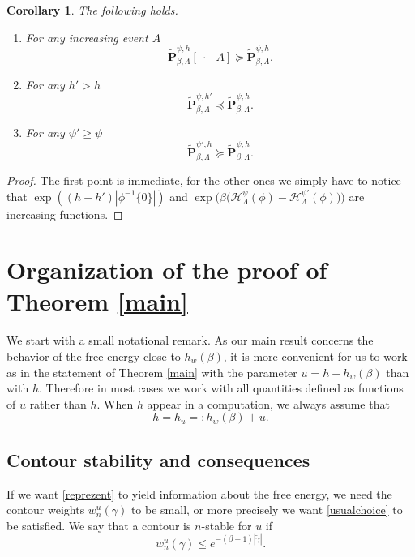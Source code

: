 \documentclass[10pt]{amsart}
\let\mathcal\mathscr
\newenvironment{enumeratei}
{\bgroup\def\theenumi{\roman{enumi}}\def\theenumii{\Alph{enumii}}\begin{enumerate}}
{\end{enumerate}\egroup}
\numberwithin{equation}{section}
\theoremstyle{plain}
\newtheorem{cor}[theorem]{Corollary}
\theoremstyle{definition}
\newcommand{\cH}{{\ensuremath{\mathcal H}} }
\newcommand{\bP}{{\ensuremath{\mathbf P}} }
\newcommand{\gb}{\beta}
\newcommand{\gL}{\Lambda}
\begin{document}
\begin{cor}\label{FKalt}
The following holds.
\begin{enumeratei}
\item
For any increasing event $A$
\begin{equation*}%
\tilde \bP^{\psi,h}_{\gb,\gL}[ \ \cdot \ | \ A] \succcurlyeq \tilde \bP^{\psi,h}_{\gb,\gL}.
\end{equation*}
\item
For any $h'>h$
\begin{equation*}
\tilde \bP^{\psi,h'}_{\gb,\gL} \preccurlyeq \tilde \bP^{\psi,h}_{\gb,\gL}.
\end{equation*}
\item
For any $\psi'\ge \psi$
\begin{equation*}
\tilde \bP^{\psi',h}_{\gb,\gL} \succcurlyeq \tilde \bP^{\psi,h}_{\gb,\gL}.
\end{equation*}
\end{enumeratei}
\end{cor}

\begin{proof}
The first point is immediate, for the other ones we simply have to notice that
$\exp((h-h')|\phi^{-1}\{0\}|)$ and $\exp\bigl(\gb \bigl(\cH^\psi_\gL(\phi)-\cH^{\psi'}_\gL(\phi) \bigr) \bigr)$ are increasing functions.
\end{proof}

\section{Organization of the proof of Theorem \ref{main}}\label{zorga}

We start with a small notational remark. As our main result concerns the behavior of the free energy close to $h_w(\gb)$,
it is more convenient for us to work as in the statement of Theorem \ref{main} with the parameter $u=h-h_w(\gb)$ than with $h$.
Therefore in most cases we work with all quantities defined as functions of $u$ rather than $h$.
When $h$ appear in a computation, we always assume that
\[
h=h_u=: h_w(\gb)+u.
\]

\subsection{Contour stability and consequences}\label{stabcon}

If we want \eqref{reprezent} to yield information about the free energy, we need the contour weights $w^u_n(\gamma)$ to be small, or more precisely
we want \eqref{usualchoice} to be satisfied.
We say that a contour is $n$-stable for $u$ if
\begin{equation}\label{stability}
w^u_n(\gamma)\le e^{-(\gb-1) |\tilde \gamma|}.
\end{equation}
\end{document}
